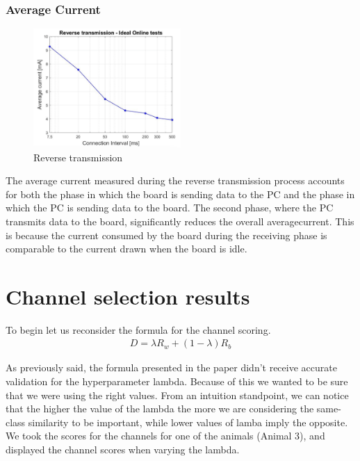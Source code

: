 \documentclass{Configuration_Files/PoliMi3i_thesis}
\begin{document}
\subsubsection*{Average Current}

\begin{figure}[H]
    \centering
    \includegraphics[width=0.5\textwidth]{Results Manuel/figure40}
    \caption{Reverse transmission}
    \label{manuel_results_40}
\end{figure}

The average current measured during the reverse transmission process accounts for both the phase in which the board is sending data to the PC and the phase in which the PC is sending data to the board. The second phase, where the PC transmits data to the board, significantly reduces the overall averagecurrent. This is because the current consumed by the board during the receiving phase is comparable to the current drawn when the board is idle.

\section{Channel selection results}

To begin let us reconsider the formula for the channel scoring.
\begin{align}
	D = \lambda R_w + (1-\lambda)R_b
   \label{eq:XCDC6}
\end{align}

As previously said, the formula presented in the paper \cite{yuCrossCorrelationBasedDiscriminant2021}
didn't receive accurate validation for the hyperparameter lambda.
Because of this we wanted to be sure that we were using the right values.
From an intuition standpoint, we can notice that the higher the value of the lambda the more we are considering the same-class similarity to be important, while lower values of lamba imply the opposite.
We took the scores for the channels for one of the animals (Animal 3), and displayed the channel scores when varying the lambda.
\end{document}
